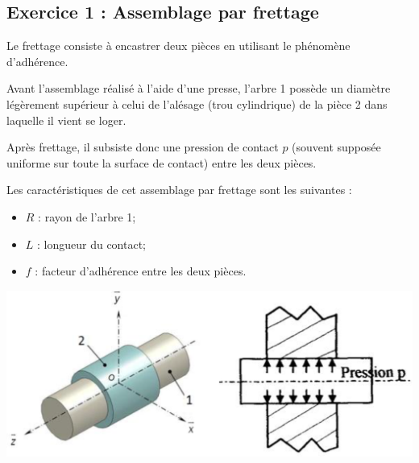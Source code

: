 \documentclass[10pt,fleqn]{article} %
\begin{document}
\def\pathfig{images}

\vspace{4.5cm}
\pagestyle{fancy}
\thispagestyle{plain}

\def\columnseprulecolor{\color{ocre}}
\setlength{\columnseprule}{0.4pt} 

\def\pathfig{images}


\ifprof
\begin{multicols}{2}
\else
\begin{multicols}{2}
\fi

\subsection*{Exercice 1 : Assemblage par frettage}
Le frettage consiste à encastrer deux pièces en utilisant le phénomène d’adhérence. 
 
Avant l’assemblage réalisé à l’aide d’une presse, l’arbre 1 
possède un diamètre légèrement supérieur à celui de l’alésage 
(trou cylindrique) de la pièce 2 dans laquelle il vient se loger. 
 
Après frettage, il subsiste donc une pression de contact $p$ 
(souvent supposée uniforme sur toute la surface de contact) 
entre les deux pièces. 

 
Les caractéristiques de cet assemblage par frettage sont les suivantes : 
\begin{itemize}
\item $R$ : rayon de l’arbre 1;
\item $L$ : longueur du contact; 
\item $f$ : facteur d’adhérence entre les deux pièces.
\end{itemize}


\begin{center}
\includegraphics[width=\linewidth]{images/fig_01}
\end{center}




\end{multicols}
\end{multicols}
\end{document}
